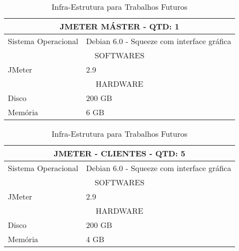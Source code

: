 \begin{table}[h]
	\caption{Infra-Estrutura para Trabalhos Futuros}
	\begin{center}
	\begin{tabular} {|l|l|}
		\hline
			\multicolumn{2}{|c|}{JMETER MÁSTER - QTD: 1} \\
		\hline
			Sistema Operacional & Debian 6.0 - Squeeze com interface gráfica \\
		\hline
			\multicolumn{2}{|c|}{SOFTWARES}\\
		\hline
			JMeter & 2.9\\
		\hline
			\multicolumn{2}{|c|}{HARDWARE}\\
		\hline
			Disco & 200 GB\\
		\hline
			Memória & 6 GB\\
		\hline
	\end {tabular}
	\end{center}
	\label{tab:infra2}
\end{table}


\begin{table}[h]
	\caption{Infra-Estrutura para Trabalhos Futuros}
	\begin{center}
	\begin{tabular} {|l|l|}
		\hline
			\multicolumn{2}{|c|}{JMETER - CLIENTES - QTD: 5} \\
		\hline
			Sistema Operacional & Debian 6.0 - Squeeze com interface gráfica \\
		\hline
			\multicolumn{2}{|c|}{SOFTWARES}\\
		\hline
			JMeter & 2.9\\
		\hline
			\multicolumn{2}{|c|}{HARDWARE}\\
		\hline
			Disco & 200 GB\\
		\hline
			Memória & 4 GB\\
		\hline
	\end {tabular}
	\end{center}
	\label{tab:infra3}
\end{table}


